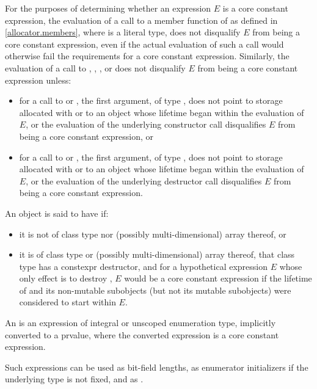 \pnum
For the purposes of determining
whether an expression $E$ is a core constant expression,
the evaluation of a call to a member function of 
as defined in \ref{allocator.members}, where  is a literal type,
does not disqualify $E$ from being a core constant expression,
even if the actual evaluation of such a call
would otherwise fail the requirements for a core constant expression.
Similarly, the evaluation of a call to
,
,
, or
does not disqualify $E$
from being a core constant expression unless:
\begin{itemize}
\item
  for a call to  or ,
  the first argument, of type ,
  does not point
  to storage allocated with  or
  to an object whose lifetime began within the evaluation of $E$, or
  the evaluation of the underlying constructor call
  disqualifies $E$ from being a core constant expression, or
\item
  for a call to  or ,
  the first argument, of type ,
  does not point
  to storage allocated with  or
  to an object whose lifetime began within the evaluation of $E$, or
  the evaluation of the underlying destructor call
  disqualifies $E$ from being a core constant expression.
\end{itemize}

\pnum
An object  is said to have  if:
\begin{itemize}
\item
  it is not of class type nor (possibly multi-dimensional) array thereof, or
\item
  it is of class type or (possibly multi-dimensional) array thereof,
  that class type has a constexpr destructor, and
  for a hypothetical expression $E$
  whose only effect is to destroy ,
  $E$ would be a core constant expression
  if the lifetime of  and its non-mutable subobjects
  (but not its mutable subobjects) were considered to start within $E$.
\end{itemize}

\pnum
An 
is an expression of integral or
unscoped enumeration type, implicitly converted to a prvalue, where the converted expression is a core constant expression.
\begin{note}
Such expressions can be
used as bit-field lengths, as enumerator
initializers if the underlying type is not fixed,
and as .
\end{note}

